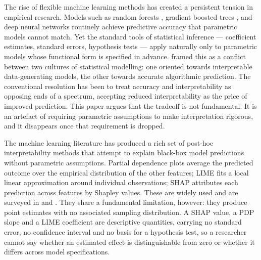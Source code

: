 \documentclass[12pt,a4paper]{article}
\numberwithin{equation}{section}
\theoremstyle{plain}
\theoremstyle{definition}
\begin{document}
	The rise of flexible machine learning methods has created a persistent tension in
	empirical research. Models such as random forests \citep{breiman2001rf}, gradient
	boosted trees \citep{chen2016xgboost}, and deep neural networks \citep{hastie2009esl}
	routinely achieve predictive accuracy that parametric models cannot match. Yet the
	standard tools of statistical inference --- coefficient estimates, standard errors,
	hypothesis tests --- apply naturally only to parametric models whose functional form
	is specified in advance. \citet{breiman2001cultures} framed this as a conflict between
	two cultures of statistical modelling: one oriented towards interpretable
	data-generating models, the other towards accurate algorithmic prediction. The
	conventional resolution has been to treat accuracy and interpretability as opposing
	ends of a spectrum, accepting reduced interpretability as the price of improved
	prediction. This paper argues that the tradeoff is not fundamental. It is an artefact
	of requiring parametric assumptions to make interpretation rigorous, and it disappears
	once that requirement is dropped.
	
	The machine learning literature has produced a rich set of post-hoc interpretability
	methods that attempt to explain black-box model predictions without parametric
	assumptions. Partial dependence plots \citep{friedman2001pdp} average the predicted
	outcome over the empirical distribution of the other features; LIME
	\citep{ribeiro2016lime} fits a local linear approximation around individual
	observations; SHAP \citep{lundberg2017shap} attributes each prediction across
	features by Shapley values. These are widely used and are surveyed in
	\citet{molnar2025} and \citet{doshivelez2017interpretability}. They share a fundamental limitation, however: they produce point estimates
	with no associated sampling distribution. A SHAP value, a PDP slope and a LIME
	coefficient are descriptive quantities, carrying no standard error, no
	confidence interval and no basis for a hypothesis test, so a researcher cannot
	say whether an estimated effect is distinguishable from zero or whether it
	differs across model specifications.
	
\end{document}
